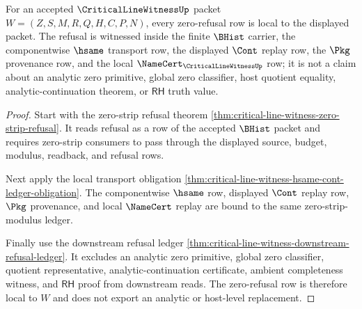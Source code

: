 \begin{theorem}
\label{thm:critical-line-witness-zero-refusal-locality}
For an accepted $\CriticalLineWitnessUp$ packet
$W=(Z,S,M,R,Q,H,C,P,N)$, every zero-refusal row is local to the displayed
packet. The refusal is witnessed inside the finite $\BHist$ carrier, the
componentwise $\hsame$ transport row, the displayed $\Cont$ replay row, the
$\Pkg$ provenance row, and the local $\NameCert_{\CriticalLineWitnessUp}$
row; it is not a claim about an analytic zero primitive, global zero
classifier, host quotient equality, analytic-continuation theorem, or
$\mathsf{RH}$ truth value.
\end{theorem}
\begin{proof}
Start with the zero-strip refusal theorem
\autoref{thm:critical-line-witness-zero-strip-refusal}. It reads refusal as a
row of the accepted $\BHist$ packet and requires zero-strip consumers to pass
through the displayed source, budget, modulus, readback, and refusal rows.

Next apply the local transport obligation
\autoref{thm:critical-line-witness-hsame-cont-ledger-obligation}. The
componentwise $\hsame$ row, displayed $\Cont$ replay row, $\Pkg$ provenance,
and local $\NameCert$ replay are bound to the same zero-strip-modulus ledger.

Finally use the downstream refusal ledger
\autoref{thm:critical-line-witness-downstream-refusal-ledger}. It excludes
an analytic zero primitive, global zero classifier, quotient representative,
analytic-continuation certificate, ambient completeness witness, and
$\mathsf{RH}$ proof from downstream reads. The zero-refusal row is therefore
local to $W$ and does not export an analytic or host-level replacement.
\end{proof}


